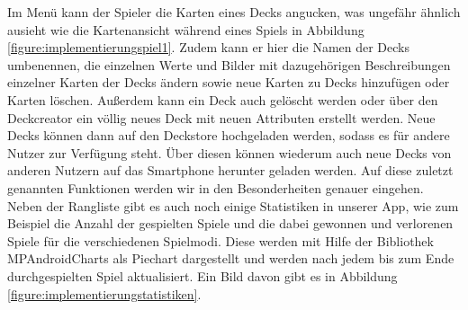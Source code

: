 Im Menü kann der Spieler die Karten eines Decks angucken, was ungefähr ähnlich ausieht wie die Kartenansicht während eines Spiels in Abbildung \ref{figure:implementierungspiel1}. Zudem kann er hier die Namen der Decks umbenennen, die einzelnen Werte und Bilder mit dazugehörigen Beschreibungen einzelner Karten der Decks ändern sowie neue Karten zu Decks hinzufügen oder Karten löschen. Außerdem kann ein Deck auch gelöscht werden oder über den Deckcreator ein völlig neues Deck mit neuen Attributen erstellt werden. Neue Decks können dann auf den Deckstore hochgeladen werden, sodass es für andere Nutzer zur Verfügung steht. Über diesen können wiederum auch neue Decks von anderen Nutzern auf das Smartphone herunter geladen werden. Auf diese zuletzt genannten Funktionen werden wir in den Besonderheiten genauer eingehen.\\

Neben der Rangliste gibt es auch noch einige Statistiken in unserer App, wie zum Beispiel die Anzahl der gespielten Spiele und die dabei gewonnen und verlorenen Spiele für die verschiedenen Spielmodi. Diese werden mit Hilfe der Bibliothek MPAndroidCharts als Piechart dargestellt und werden nach jedem bis zum Ende durchgespielten Spiel aktualisiert. Ein Bild davon gibt es in Abbildung \ref{figure:implementierungstatistiken}.\\

